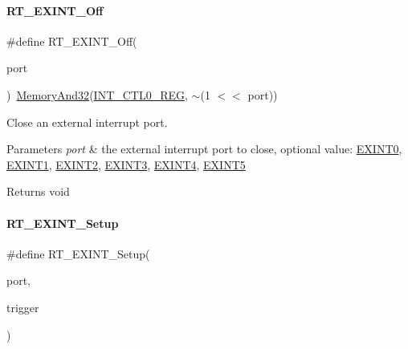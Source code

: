 \paragraph{\texorpdfstring{R\+T\+\_\+\+E\+X\+I\+N\+T\+\_\+\+Off}{RT\_EXINT\_Off}}
{\footnotesize\ttfamily \#define R\+T\+\_\+\+E\+X\+I\+N\+T\+\_\+\+Off(\begin{DoxyParamCaption}\item[{}]{port }\end{DoxyParamCaption})~\mbox{\hyperlink{a00020_ad87cedffcaadc51db22594fce55173d4}{Memory\+And32}}(\mbox{\hyperlink{a00020_adadaa0ab1ebbd7ba9b70dfd24c3ed44da417bb62509b1343f4685a023c8ec4b09}{I\+N\+T\+\_\+\+C\+T\+L0\+\_\+\+R\+EG}}, $\sim$(1 $<$$<$ port))}



Close an external interrupt port. 


\begin{DoxyParams}{Parameters}
{\em port} & the external interrupt port to close, optional value\+: \mbox{\hyperlink{a00011_a2e3f727d359d26314631842394f4a223}{E\+X\+I\+N\+T0}}, \mbox{\hyperlink{a00011_a1ea7d6796165b98f1bc6bf6fe841c3d9}{E\+X\+I\+N\+T1}}, \mbox{\hyperlink{a00011_ac959f4d8aed4e04e25c966e6c8315431}{E\+X\+I\+N\+T2}}, \mbox{\hyperlink{a00011_ae8428c0cbd7362b90ea048bcf59aef2c}{E\+X\+I\+N\+T3}}, \mbox{\hyperlink{a00011_a719b5fa27b5469e1fe2844e9930fa249}{E\+X\+I\+N\+T4}}, \mbox{\hyperlink{a00011_a309fb21107f9f6261cd7e7ca9de6c2f2}{E\+X\+I\+N\+T5}} \\
\hline
\end{DoxyParams}
\begin{DoxyReturn}{Returns}
void 
\end{DoxyReturn}
\mbox{\label{a00011_a32678a4a1877f8e6fcae9fad3dd436ed}} 
\paragraph{\texorpdfstring{R\+T\+\_\+\+E\+X\+I\+N\+T\+\_\+\+Setup}{RT\_EXINT\_Setup}}
{\footnotesize\ttfamily \#define R\+T\+\_\+\+E\+X\+I\+N\+T\+\_\+\+Setup(\begin{DoxyParamCaption}\item[{}]{port,  }\item[{}]{trigger }\end{DoxyParamCaption})}

